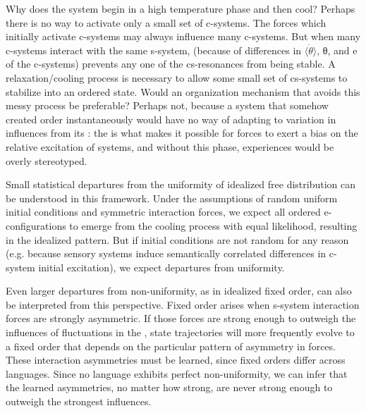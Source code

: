   Why does the system begin in a high temperature phase and then cool? Perhaps there is no way to activate only a small set of c-systems. The  forces which initially activate c-systems may always influence many c-systems. But when many c-systems interact with the same s-system,  (because of differences in $\langle\dot{\theta}\rangle$, θ, and e of the c-systems) prevents any one of the cs-resonances from being stable. A relaxation/cooling process is necessary to allow some small set of cs-systems to stabilize into an ordered state. Would an organization mechanism that avoids this messy process be preferable? Perhaps not, because a system that somehow created order instantaneously would have no way of adapting to variation in influences from its : the  is what makes it possible for  forces to exert a bias on the relative excitation of systems, and without this phase,  experiences would be overly stereotyped.

Small statistical departures from the uniformity of idealized free  distribution can be understood in this framework. Under the assumptions of random uniform initial conditions and symmetric interaction forces, we expect all ordered e-con\-fig\-u\-ra\-tions to emerge from the cooling process with equal likelihood, resulting in the idealized  pattern. But if initial conditions are not random for any reason (e.g. because sensory systems induce semantically correlated differences in c-system initial excitation), we expect departures from uniformity.

  Even larger departures from non-uniformity, as in idealized fixed order, can also be interpreted from this perspective. Fixed order arises when s-system interaction forces are strongly asymmetric. If those forces are strong enough to outweigh the influences of fluctuations in the , state trajectories will more frequently evolve to a fixed order that depends on the particular pattern of asymmetry in  forces. These interaction asymmetries must be learned, since fixed orders differ across languages. Since no language exhibits perfect non-uniformity, we can infer that the learned asymmetries, no matter how strong, are never strong enough to outweigh the strongest  influences.

